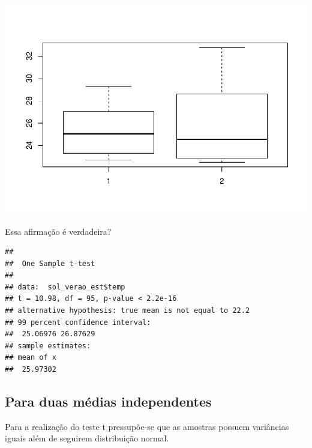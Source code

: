 \documentclass[
]{book}
\newenvironment{Shaded}{\begin{snugshade}}{\end{snugshade}}
\newcommand{\CommentTok}[1]{\textcolor[rgb]{0.56,0.35,0.01}{\textit{#1}}}
\newcommand{\DataTypeTok}[1]{\textcolor[rgb]{0.13,0.29,0.53}{#1}}
\newcommand{\FloatTok}[1]{\textcolor[rgb]{0.00,0.00,0.81}{#1}}
\newcommand{\KeywordTok}[1]{\textcolor[rgb]{0.13,0.29,0.53}{\textbf{#1}}}
\newcommand{\NormalTok}[1]{#1}
\newcommand{\OperatorTok}[1]{\textcolor[rgb]{0.81,0.36,0.00}{\textbf{#1}}}
\newcommand{\StringTok}[1]{\textcolor[rgb]{0.31,0.60,0.02}{#1}}
\begin{document}
\includegraphics{TudodoR_files/figure-latex/unnamed-chunk-255-1.pdf}

Essa afirmação é verdadeira?

\begin{Shaded}
\end{Shaded}

\begin{verbatim}
## 
##  One Sample t-test
## 
## data:  sol_verao_est$temp
## t = 10.98, df = 95, p-value < 2.2e-16
## alternative hypothesis: true mean is not equal to 22.2
## 99 percent confidence interval:
##  25.06976 26.87629
## sample estimates:
## mean of x 
##  25.97302
\end{verbatim}

\hypertarget{para-duas-muxe9dias-independentes}{%
\subsection{Para duas médias independentes}\label{para-duas-muxe9dias-independentes}}

Para a realização do teste t pressupõe-se que as amostras possuem variâncias iguais
além de seguirem distribuição normal.
\end{document}
